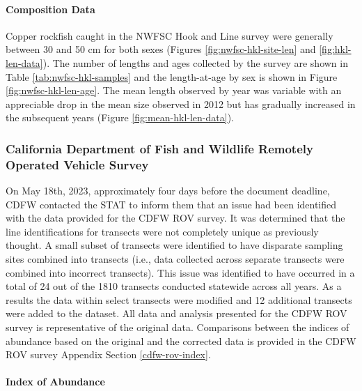 \documentclass[11pt,
  english,
  letterpaper,
]{article}
\begin{document}
\hypertarget{composition-data-3}{%
\paragraph{Composition Data}\label{composition-data-3}}

\hfill\break

Copper rockfish caught in the NWFSC Hook and Line survey were generally between 30 and 50 cm for both sexes (Figures \ref{fig:nwfsc-hkl-site-len} and \ref{fig:hkl-len-data}). The number of lengths and ages collected by the survey are shown in Table \ref{tab:nwfsc-hkl-samples} and the length-at-age by sex is shown in Figure \ref{fig:nwfsc-hkl-len-age}. The mean length observed by year was variable with an appreciable drop in the mean size observed in 2012 but has gradually increased in the subsequent years (Figure \ref{fig:mean-hkl-len-data}).

\hypertarget{california-department-of-fish-and-wildlife-remotely-operated-vehicle-survey}{%
\subsubsection{California Department of Fish and Wildlife Remotely Operated Vehicle Survey}\label{california-department-of-fish-and-wildlife-remotely-operated-vehicle-survey}}

On May 18th, 2023, approximately four days before the document deadline, CDFW contacted the STAT to inform them that an issue had been identified with the data provided for the CDFW ROV survey. It was determined that the line identifications for transects were not completely unique as previously thought. A small subset of transects were identified to have disparate sampling sites combined into transects (i.e., data collected across separate transects were combined into incorrect transects). This issue was identified to have occurred in a total of 24 out of the 1810 transects conducted statewide across all years. As a results the data within select transects were modified and 12 additional transects were added to the dataset. All data and analysis presented for the CDFW ROV survey is representative of the original data. Comparisons between the indices of abundance based on the original and the corrected data is provided in the CDFW ROV survey Appendix Section \ref{cdfw-rov-index}.

\hypertarget{index-of-abundance-2}{%
\paragraph{Index of Abundance}\label{index-of-abundance-2}}
\end{document}

